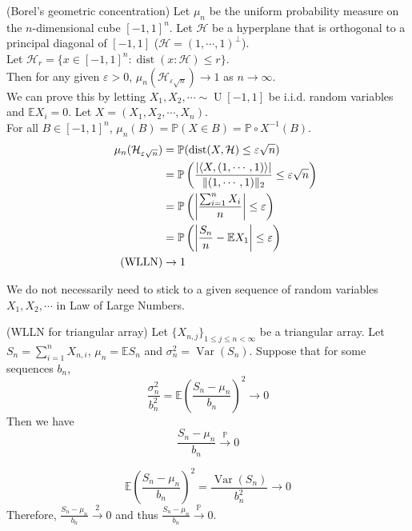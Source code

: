 \documentclass{huhtakm-template-book}
\newcommand{\prob}{\mathbb{P}}
\newcommand{\expect}{\mathbb{E}}
\DeclareMathOperator{\U}{U}
\DeclareMathOperator{\Var}{Var}
\DeclareMathOperator{\dist}{dist}
\begin{document}
\begin{eg}(Borel's geometric concentration)
    Let $\mu_{n}$ be the uniform probability measure on the $n$-dimensional cube $[-1,1]^{n}$. Let $\mathcal{H}$ be a hyperplane that is orthogonal to a principal diagonal of $[-1,1]$ ($\mathcal{H}=(1,\cdots,1)^{\perp}$).\\
    Let $\mathcal{H}_{r}=\{x\in[-1,1]^{n}:\dist(x:\mathcal{H})\leq r\}$.\\
    Then for any given $\varepsilon>0$, $\mu_{n}(\mathcal{H}_{\varepsilon\sqrt{n}})\to 1$ as $n\to\infty$.\\
    We can prove this by letting $X_{1},X_{2},\cdots\sim\U[-1,1]$ be i.i.d. random variables and $\expect X_{i}=0$. Let $X=(X_{1},X_{2},\cdots,X_{n})$.\\
    For all $B\in[-1,1]^{n}$, $\mu_{n}(B)=\prob(X\in B)=\prob\circ X^{-1}(B)$.
    \begin{align*}
        \mu_{n}(\mathcal{H}_{\varepsilon\sqrt{n}})&=\prob(\dist(X,\mathcal{H})\leq\varepsilon\sqrt{n})\\
        &=\prob\left(\frac{\abs{\left<X,(1,\cdots,1)\right>}}{\norm{(1,\cdots,1)}_{2}}\leq\varepsilon\sqrt{n}\right)\\
        &=\prob\left(\abs{\frac{\sum_{i=1}^{n}X_{i}}{n}}\leq\varepsilon\right)\\
        &=\prob\left(\abs{\frac{S_{n}}{n}-\expect X_{1}}\leq\varepsilon\right)\\
        \tag{WLLN}
        &\to 1
    \end{align*}
\end{eg}
We do not necessarily need to stick to a given sequence of random variables $X_{1},X_{2},\cdots$ in Law of Large Numbers.
\begin{thm}(WLLN for triangular array)
    Let $\{X_{n,j}\}_{1\leq j\leq n<\infty}$ be a triangular array. Let $S_{n}=\sum_{i=1}^{n}X_{n,i}$, $\mu_{n}=\expect S_{n}$ and $\sigma_{n}^{2}=\Var(S_{n})$. Suppose that for some sequences $b_{n}$,
    \begin{equation*}
        \frac{\sigma_{n}^{2}}{b_{n}^{2}}=\expect\left(\frac{S_{n}-\mu_{n}}{b_{n}}\right)^{2}\to 0
    \end{equation*}
    Then we have
    \begin{equation*}
        \frac{S_{n}-\mu_{n}}{b_{n}}\xrightarrow{\prob}0
    \end{equation*}
\end{thm}
\begin{proofing}
    \begin{equation*}
        \expect\left(\frac{S_{n}-\mu_{n}}{b_{n}}\right)^{2}=\frac{\Var(S_{n})}{b_{n}^{2}}\to 0
    \end{equation*}
    Therefore, $\frac{S_{n}-\mu_{n}}{b_{n}}\xrightarrow{2}0$ and thus $\frac{S_{n}-\mu_{n}}{b_{n}}\xrightarrow{\prob}0$.
\end{proofing}
\end{document}
